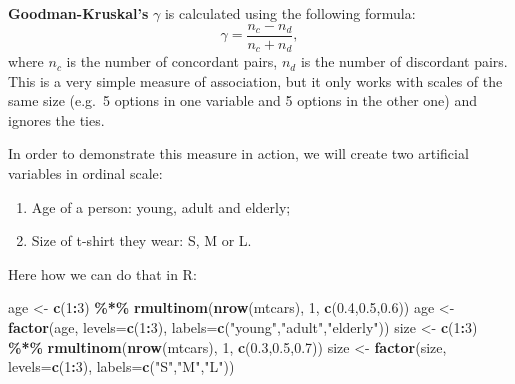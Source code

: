 \documentclass[
]{book}
\newenvironment{Shaded}{\begin{snugshade}}{\end{snugshade}}
\newcommand{\AttributeTok}[1]{\textcolor[rgb]{0.13,0.29,0.53}{#1}}
\newcommand{\DecValTok}[1]{\textcolor[rgb]{0.00,0.00,0.81}{#1}}
\newcommand{\FloatTok}[1]{\textcolor[rgb]{0.00,0.00,0.81}{#1}}
\newcommand{\FunctionTok}[1]{\textcolor[rgb]{0.13,0.29,0.53}{\textbf{#1}}}
\newcommand{\NormalTok}[1]{#1}
\newcommand{\OtherTok}[1]{\textcolor[rgb]{0.56,0.35,0.01}{#1}}
\newcommand{\SpecialCharTok}[1]{\textcolor[rgb]{0.81,0.36,0.00}{\textbf{#1}}}
\newcommand{\StringTok}[1]{\textcolor[rgb]{0.31,0.60,0.02}{#1}}
\providecommand{\tightlist}{%
  \setlength{\itemsep}{0pt}\setlength{\parskip}{0pt}}
\theoremstyle{definition}
\theoremstyle{definition}
\theoremstyle{definition}
\theoremstyle{definition}
\theoremstyle{remark}
\begin{document}
\textbf{Goodman-Kruskal's} \(\gamma\) is calculated using the following formula:
\begin{equation}
    \gamma = \frac{n_c - n_d}{n_c + n_d},
    \label{eq:measuresAssociationGoodman}
\end{equation}
where \(n_c\) is the number of concordant pairs, \(n_d\) is the number of discordant pairs. This is a very simple measure of association, but it only works with scales of the same size (e.g.~5 options in one variable and 5 options in the other one) and ignores the ties.

In order to demonstrate this measure in action, we will create two artificial variables in ordinal scale:

\begin{enumerate}
\def\labelenumi{\arabic{enumi}.}
\tightlist
\item
  Age of a person: young, adult and elderly;
\item
  Size of t-shirt they wear: S, M or L.
\end{enumerate}

Here how we can do that in R:

\begin{Shaded}
\begin{Highlighting}[]
\NormalTok{age }\OtherTok{\textless{}{-}} \FunctionTok{c}\NormalTok{(}\DecValTok{1}\SpecialCharTok{:}\DecValTok{3}\NormalTok{) }\SpecialCharTok{\%*\%} \FunctionTok{rmultinom}\NormalTok{(}\FunctionTok{nrow}\NormalTok{(mtcars), }\DecValTok{1}\NormalTok{,}
                               \FunctionTok{c}\NormalTok{(}\FloatTok{0.4}\NormalTok{,}\FloatTok{0.5}\NormalTok{,}\FloatTok{0.6}\NormalTok{))}
\NormalTok{age }\OtherTok{\textless{}{-}} \FunctionTok{factor}\NormalTok{(age, }\AttributeTok{levels=}\FunctionTok{c}\NormalTok{(}\DecValTok{1}\SpecialCharTok{:}\DecValTok{3}\NormalTok{),}
                 \AttributeTok{labels=}\FunctionTok{c}\NormalTok{(}\StringTok{"young"}\NormalTok{,}\StringTok{"adult"}\NormalTok{,}\StringTok{"elderly"}\NormalTok{))}
\NormalTok{size }\OtherTok{\textless{}{-}} \FunctionTok{c}\NormalTok{(}\DecValTok{1}\SpecialCharTok{:}\DecValTok{3}\NormalTok{) }\SpecialCharTok{\%*\%} \FunctionTok{rmultinom}\NormalTok{(}\FunctionTok{nrow}\NormalTok{(mtcars), }\DecValTok{1}\NormalTok{,}
                               \FunctionTok{c}\NormalTok{(}\FloatTok{0.3}\NormalTok{,}\FloatTok{0.5}\NormalTok{,}\FloatTok{0.7}\NormalTok{))}
\NormalTok{size }\OtherTok{\textless{}{-}} \FunctionTok{factor}\NormalTok{(size, }\AttributeTok{levels=}\FunctionTok{c}\NormalTok{(}\DecValTok{1}\SpecialCharTok{:}\DecValTok{3}\NormalTok{),}
                 \AttributeTok{labels=}\FunctionTok{c}\NormalTok{(}\StringTok{"S"}\NormalTok{,}\StringTok{"M"}\NormalTok{,}\StringTok{"L"}\NormalTok{))}
\end{Highlighting}
\end{Shaded}
\end{document}
